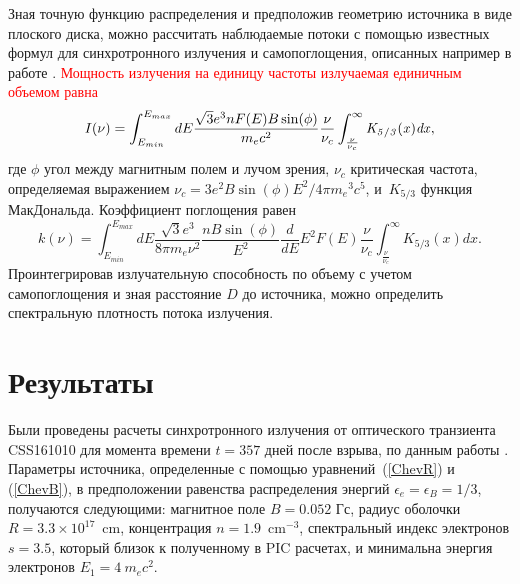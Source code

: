Зная точную функцию распределения и предположив геометрию источника в виде плоского диска, можно рассчитать наблюдаемые потоки с помощью известных формул для синхротронного излучения и самопоглощения, описанных например в работе \cite{Ghisellini}. \textcolor{red}{Мощность излучения на единицу частоты излучаемая единичным объемом равна}
\begin{equation} \label{emission}
	I(\nu)=\int_{E_{min}}^{E_{max}} dE \frac {\sqrt {3}{e}^{3}n F(E) B \sin ( \phi)}{{m_e}{c}^{2}}
	\frac{\nu}{\nu_c}\int_{\frac {\nu}{\nu_c}}^{\infty }\it K_{5/3}(x)dx,
\end{equation}
где $\phi$ угол между магнитным полем и лучом зрения, $\displaystyle\nu_{c}$ критическая частота, определяемая выражением
$\displaystyle\nu_{c} = 3 e^{2} B \sin(\phi) E^{2}/4\pi {m_{e}}^{3} c^{5}$, и~$K_{5/3}$ функция МакДональда. Коэффициент поглощения равен
\begin{equation}\label{absorption}
	k(\nu)=\int_{E_{min}}^{E_{max}}dE\frac {\sqrt {3}{e}^{3}}{8\pi m_e \nu^2}\frac{n B\sin(\phi)}{E^2}
	\frac{d}{dE} E^2 F(E)\frac {\nu}{ \nu_c}\int_{\frac {\nu}{ \nu_c}}^{\infty }K_{5/3}(x) dx.
\end{equation}
Проинтегрировав излучательную способность по объему с учетом самопоглощения и зная расстояние $\displaystyle D$ до источника, можно определить спектральную плотность потока излучения.

\section{Результаты}
Были проведены расчеты синхротронного излучения от оптического транзиента CSS161010 для момента времени $\displaystyle t = 357$ дней после взрыва, по данным работы \cite{Coppejans2020}. Параметры источника, определенные с помощью уравнений~(\ref{ChevR})
и (\ref{ChevB}), в предположении равенства распределения энергий $\epsilon_e = \epsilon_B = 1/3$, получаются следующими: магнитное поле $\displaystyle B = 0.052$ Гс, радиус оболочки $\displaystyle R = 3.3\times10^{17}$~cm,
концентрация $n = 1.9$~cm$^{-3}$, спектральный индекс электронов $s = 3.5$, который близок к полученному в PIC расчетах, и минимальна энергия электронов $\displaystyle E_{1} = 4~m_{e}c^{2}$.

